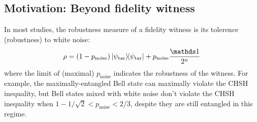 \documentclass[
aps,
pra,
twocolumn,
floatfix,
]{revtex4-2}
\theoremstyle{plain}
\newtheorem{theorem}{Theorem}
\theoremstyle{definition}
\newcommand{\dm}{\rho}
\newcommand{\ghz}{\text{GHZ}}
\newcommand{\target}{\textup{tar}}
\newcommand{\noise}{\text{noise}}
\newcommand{\D}{\mathcal{D}}
\begin{document}
\subsection{Motivation: Beyond fidelity witness}
In most studies, the robustness measure of a fidelity witness is its tolerence (robustness) to white noise:
\begin{equation}\label{eq:white_noise}
	\dm
	= (1-p_{\noise}) \op{\psi_{\target}} + p_{\noise} \frac{\identity}{2^{n}}
\end{equation}
where the limit of (maximal) $p_{\noise}$ indicates the robustness of the witness.
For example, the maximally-entangled Bell state can maximally violate the CHSH inequality, 
but Bell states mixed with white noise don't violate the CHSH inequality when $ 1- 1/ \sqrt{2} < p_{\noise}<2/3 $, despite they are still entangled in this regime.
\end{document}
